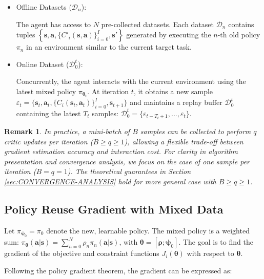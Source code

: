 \documentclass{IEEEtran}
\newtheorem{remark}{Remark}
\begin{document}
\begin{itemize}
\item Offline Datasets ($\mathcal{D}_{n}$):

The agent has access to $N$ pre-collected datasets. Each dataset $\mathcal{D}_{n}$ contains tuples $\left\{ \boldsymbol{s},\boldsymbol{a},\{C'_{i}(\boldsymbol{s},\boldsymbol{a})\}_{i=0}^{I},\boldsymbol{s}'\right\} $ generated by executing the $n$-th old policy $\pi_{n}$ in an environment similar to the current target task.
\item Online Dataset ($\mathcal{D}_{0}^{t}$):

Concurrently, the agent interacts with the current environment using the latest mixed policy $\pi_{\boldsymbol{\theta}_{t}}$. At iteration $t$, it obtains a new sample $\varepsilon_{t}=\{\boldsymbol{s}_{t},\boldsymbol{a}_{t},\{C_{i}(\boldsymbol{s}_{t},\boldsymbol{a}_{t})\}_{i=0}^{I},\boldsymbol{s}_{t+1}\}$ and maintains a replay buffer $\mathcal{D}_{0}^{t}$ containing the latest $T_{t}$ samples: $\mathcal{D}_{0}^{t}=\{\varepsilon_{t-T_{t}+1},...,\varepsilon_{t}\}$.
\end{itemize}
\begin{remark}
In practice, a mini-batch of $B$ samples can be collected to perform $q$ critic updates per iteration ($B\geq q\geq1$), allowing a flexible trade-off between gradient estimation accuracy and interaction cost. For clarity in algorithm presentation and convergence analysis, we focus on the case of one sample per iteration ($B=q=1$). The theoretical guarantees in Section \ref{sec:CONVERGENCE-ANALYSIS} hold for more general case with $B\geq q\geq1$.

\end{remark}

\subsection{Policy Reuse Gradient with Mixed Data}
Let $\pi_{\boldsymbol{\psi}_{0}}=\pi_{0}$ denote the new, learnable policy. The mixed policy is a weighted sum: $\pi_{\boldsymbol{\theta}}(\boldsymbol{a}|\boldsymbol{s})=\sum_{n=0}^{N}\rho_{n}\pi_{n}(\boldsymbol{a}|\boldsymbol{s})$, with $\boldsymbol{\theta}=[\boldsymbol{\rho};\boldsymbol{\psi}_{0}]$. The goal is to find the gradient of the objective and constraint functions $J_{i}(\boldsymbol{\theta})$ with respect to $\boldsymbol{\theta}$.

Following the policy gradient theorem, the gradient can be expressed as:
\end{document}
